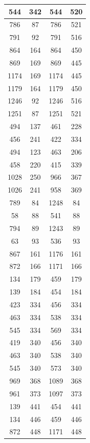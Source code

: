\documentclass[12pt]{article}
\begin{document}
\begin{enumerate}
\begin{enumerate}
\begin{longtable}{|c|c|c|c|}
			544  & 342 & 544  & 520  \\ \hline
			786  & 87  & 786  & 521  \\ \hline
			791  & 92  & 791  & 516  \\ \hline
			864  & 164 & 864  & 450  \\ \hline
			869  & 169 & 869  & 445  \\ \hline
			1174 & 169 & 1174 & 445  \\ \hline
			1179 & 164 & 1179 & 450  \\ \hline
			1246 & 92  & 1246 & 516  \\ \hline
			1251 & 87  & 1251 & 521  \\ \hline
			494  & 137 & 461  & 228  \\ \hline
			456  & 241 & 422  & 334  \\ \hline
			494  & 123 & 463  & 206  \\ \hline
			458  & 220 & 415  & 339  \\ \hline
			1028 & 250 & 966  & 367  \\ \hline
			1026 & 241 & 958  & 369  \\ \hline
			789  & 84  & 1248 & 84   \\ \hline
			58   & 88  & 541  & 88   \\ \hline
			794  & 89  & 1243 & 89   \\ \hline
			63   & 93  & 536  & 93   \\ \hline
			867  & 161 & 1176 & 161  \\ \hline
			872  & 166 & 1171 & 166  \\ \hline
			134  & 179 & 459  & 179  \\ \hline
			139  & 184 & 454  & 184  \\ \hline
			423  & 334 & 456  & 334  \\ \hline
			463  & 334 & 538  & 334  \\ \hline
			545  & 334 & 569  & 334  \\ \hline
			419  & 340 & 456  & 340  \\ \hline
			463  & 340 & 538  & 340  \\ \hline
			545  & 340 & 573  & 340  \\ \hline
			969  & 368 & 1089 & 368  \\ \hline
			961  & 373 & 1097 & 373  \\ \hline
			139  & 441 & 454  & 441  \\ \hline
			134  & 446 & 459  & 446  \\ \hline
			872  & 448 & 1171 & 448  \\ \hline

\end{longtable}
\end{enumerate}
\end{enumerate}
\end{document}
